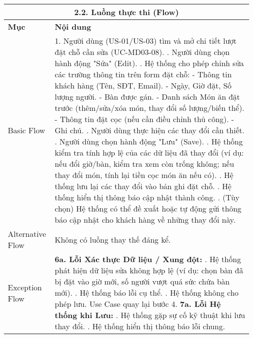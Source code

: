 \begin{longtable}{|m{4cm}|p{11cm}|}
\multicolumn{2}{|c|}{\textbf{2.2. Luồng thực thi (Flow)}} \\
\hline
\textbf{Mục} & \textbf{Nội dung} \\
\hline
Basic Flow & 1. Người dùng (US-01/US-03) tìm và mở chi tiết lượt đặt chỗ cần sửa (UC-MD03-08). \newline 2. Người dùng chọn hành động "Sửa" (Edit). \newline 3. Hệ thống cho phép chỉnh sửa các trường thông tin trên form đặt chỗ: \newline    - Thông tin khách hàng (Tên, SĐT, Email). \newline    - Ngày, Giờ đặt, Số lượng người. \newline    - Bàn được gán. \newline    - Danh sách Món ăn đặt trước (thêm/sửa/xóa món, thay đổi số lượng/biến thể). \newline    - Thông tin đặt cọc (nếu cần điều chỉnh thủ công). \newline    - Ghi chú. \newline 4. Người dùng thực hiện các thay đổi cần thiết. \newline 5. Người dùng chọn hành động "Lưu" (Save). \newline 6. Hệ thống kiểm tra tính hợp lệ của các dữ liệu đã thay đổi (ví dụ: nếu đổi giờ/bàn, kiểm tra xem còn trống không; nếu thay đổi món, tính lại tiền cọc món ăn nếu có). \newline 7. Hệ thống lưu lại các thay đổi vào bản ghi đặt chỗ. \newline 8. Hệ thống hiển thị thông báo cập nhật thành công. \newline 9. (Tùy chọn) Hệ thống có thể đề xuất hoặc tự động gửi thông báo cập nhật cho khách hàng về những thay đổi này. \\
\hline
Alternative Flow & Không có luồng thay thế đáng kể. \\
\hline
Exception Flow & \textbf{6a. Lỗi Xác thực Dữ liệu / Xung đột:} \newline    1. Hệ thống phát hiện dữ liệu sửa không hợp lệ (ví dụ: chọn bàn đã bị đặt vào giờ mới, số người vượt quá sức chứa bàn mới). \newline    2. Hệ thống báo lỗi cụ thể. \newline    3. Hệ thống không cho phép lưu. Use Case quay lại bước 4. \newline \textbf{7a. Lỗi Hệ thống khi Lưu:} \newline    1. Hệ thống gặp sự cố kỹ thuật khi lưu thay đổi. \newline    2. Hệ thống hiển thị thông báo lỗi chung. \\

\end{longtable}
